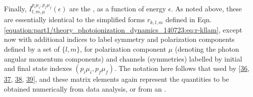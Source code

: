 \documentclass[letterpaper,table,10pt,english]{jupyterBook}
\begin{document}
\sphinxAtStartPar
Finally, \(I_{l,m,\mu}^{p_{i}\mu_{i},p_{f}\mu_{f}}(\epsilon)\) are the {\hyperref[\detokenize{backmatter/glossary:term-radial-matrix-elements}]{}}, as a function of energy \(\epsilon\).
As noted above, these {\hyperref[\detokenize{backmatter/glossary:term-radial-matrix-elements}]{}} are essentially identical to the simplified forms
\(r_{k,l,m}\) defined in Eqn. \eqref{equation:part1/theory_photoionization_dynamics_140723:eq:r-kllam}, except now with additional indices to label
symmetry and polarization components defined by a set of {\hyperref[\detokenize{backmatter/glossary:term-partial-waves}]{}}
\(\{l,m\}\), for polarization component \(\mu\) (denoting the photon angular
momentum components) and channels (symmetries) labelled by initial and
final state indexes \((p_{i}\mu_{i},p_{f}\mu_{f})\). The notation here
follows that used by  {[}\hyperlink{cite.backmatter/bibliography:id764}{36}, \hyperlink{cite.backmatter/bibliography:id628}{37}, \hyperlink{cite.backmatter/bibliography:id805}{38}, \hyperlink{cite.backmatter/bibliography:id767}{39}{]}, and these matrix elements again represent the quantities to be obtained numerically from data analysis, or from an .
\end{document}
